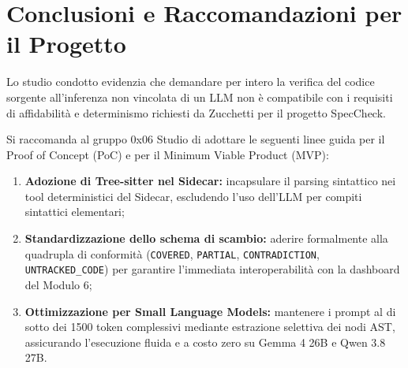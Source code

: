 \documentclass[a4paper, 11pt]{article}
\begin{document}

\section{Conclusioni e Raccomandazioni per il Progetto}
Lo studio condotto evidenzia che demandare per intero la verifica del codice sorgente all'inferenza non vincolata di un LLM non è compatibile con i requisiti di affidabilità e determinismo richiesti da Zucchetti per il progetto SpecCheck.

Si raccomanda al gruppo 0x06 Studio di adottare le seguenti linee guida per il Proof of Concept (PoC) e per il Minimum Viable Product (MVP):

\begin{enumerate}
    \item \textbf{Adozione di Tree-sitter nel Sidecar:} incapsulare il parsing sintattico nei tool deterministici del Sidecar, escludendo l'uso dell'LLM per compiti sintattici elementari;
    \item \textbf{Standardizzazione dello schema di scambio:} aderire formalmente alla quadrupla di conformità (\texttt{COVERED}, \texttt{PARTIAL}, \texttt{CONTRADICTION}, \texttt{UNTRACKED\_CODE}) per garantire l'immediata interoperabilità con la dashboard del Modulo 6;
    \item \textbf{Ottimizzazione per Small Language Models:} mantenere i prompt al di sotto dei 1500 token complessivi mediante estrazione selettiva dei nodi AST, assicurando l'esecuzione fluida e a costo zero su Gemma 4 26B e Qwen 3.8 27B.
\end{enumerate}
\end{document}
